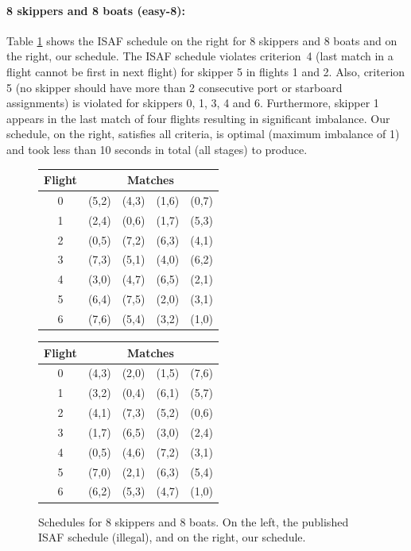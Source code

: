 \documentclass{llncs}
\begin{document}
\paragraph{8 skippers and 8 boats (easy-8):} Table \ref{08-08} shows the ISAF schedule on the right
for 8 skippers and 8 boats and on the right, our schedule.  The ISAF schedule violates criterion~4
(last match in a flight cannot be first in next flight) for skipper 5 in flights 1 and 2. Also,
criterion 5 (no skipper should have more than 2 consecutive port or starboard assignments) is
violated for skippers 0, 1, 3, 4 and 6. Furthermore, skipper 1 appears in the last match of four
flights resulting in significant imbalance. Our schedule, on the right, satisfies all criteria, is
optimal (maximum imbalance of 1) and took less than 10 seconds in total (all stages) to produce.

\begin{figure}[h]
\begin{minipage}[t]{0.48\textwidth}
    \centering
\begin{tabular}{ccccc}
        \toprule
        Flight & \multicolumn{4}{c}{Matches} \\ \midrule
0 & (5,2) & (4,3) & (1,6) & (0,7) \\
1 & (2,4) & (0,6) & (1,7) & (5,3) \\
2 & (0,5) & (7,2) & (6,3) & (4,1) \\
3 & (7,3) & (5,1) & (4,0) & (6,2) \\
4 & (3,0) & (4,7) & (6,5) & (2,1) \\
5 & (6,4) & (7,5) & (2,0) & (3,1) \\
6 & (7,6) & (5,4) & (3,2) & (1,0) \\ \bottomrule
    \end{tabular}
\label{08-08a}
\end{minipage}
\hfill
\begin{minipage}[t]{0.48\textwidth}
    \centering
\begin{tabular}{ccccc}
        \toprule
        Flight & \multicolumn{4}{c}{Matches} \\ \midrule
0 & (4,3) & (2,0) & (1,5) & (7,6) \\
1 & (3,2) & (0,4) & (6,1) & (5,7) \\ 
2 & (4,1) & (7,3) & (5,2) & (0,6) \\
3 & (1,7) & (6,5) & (3,0) & (2,4) \\ 
4 & (0,5) & (4,6) & (7,2) & (3,1) \\
5 & (7,0) & (2,1) & (6,3) & (5,4) \\ 
6 & (6,2) & (5,3) & (4,7) & (1,0) \\ \bottomrule
    \end{tabular}
\label{08-08b}
\end{minipage}
\caption{Schedules for 8 skippers and 8 boats. On the left, the published ISAF schedule (illegal),
and on the right, our schedule.}
\label{08-08}
\end{figure}
\end{document}
